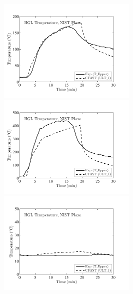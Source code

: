 \begin{figure}[p]
\begin{center}
\includegraphics[width=2.6in]{FIGURES/NIST_PLAZA/Room_1_HGL_Temp} \\
\includegraphics[width=2.6in]{FIGURES/NIST_PLAZA/Room_2_HGL_Temp} \\
\includegraphics[width=2.6in]{FIGURES/NIST_PLAZA/Room_7_HGL_Temp}
\end{center}
\end{figure}

